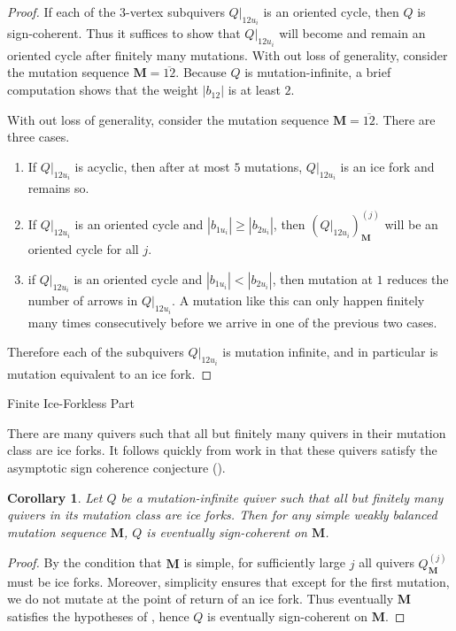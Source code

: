 \documentclass[12pt]{amsart}
\makeatletter
\newtheorem{cor}[thm]{Corollary}
\theoremstyle{definition}
\theoremstyle{remark}
\numberwithin{equation}{section}
\def\subsection{\@startsection{subsection}{3}%
  \z@{.5\linespacing\@plus.7\linespacing}{.1\linespacing}%
  {\bfseries}}
\makeatother
\begin{document}
\begin{proof}

If each of the $3$-vertex subquivers $Q|_{12u_i}$ is an oriented cycle, then $Q$ is sign-coherent. Thus it suffices to show that $Q|_{12u_i}$ will become and remain an oriented cycle after finitely many mutations. With out loss of generality, consider the mutation sequence $\mathbf M = \overline{12}$. Because $Q$ is mutation-infinite, a brief computation shows that the weight $|b_{12}|$ is at least $2$.

With out loss of generality, consider the mutation sequence $\mathbf M = \overline{12}$. 
There are three cases.
\begin{enumerate}
    \item If $Q|_{12u_i}$ is acyclic, then after at most $5$ mutations, $Q|_{12u_i}$ is an ice fork and remains so.
    \item If $Q|_{12u_i}$ is an oriented cycle and $|b_{1u_i}| \geq |b_{2u_i}|$, then $(Q|_{12u_i})^{(j)}_{\mathbf M}$ will be an oriented cycle for all $j$.
    \item if $Q|_{12u_i}$ is an oriented cycle and $|b_{1u_i}| < |b_{2u_i}|$, then mutation at $1$ reduces the number of arrows in $Q|_{12u_i}$. A mutation like this can only happen finitely many times consecutively before we arrive in one of the previous two cases.
\end{enumerate}
Therefore each of the subquivers  $Q|_{12u_i}$ is mutation infinite, and in particular is mutation equivalent to an ice fork.

\end{proof}
\fi

\subsection{Finite Ice-Forkless Part}

There are many quivers such that all but finitely many quivers in their mutation class are ice forks.  It follows quickly from work in  that these quivers satisfy the asymptotic sign coherence conjecture ().  

\begin{cor}
Let $Q$ be a mutation-infinite quiver such that all but finitely many quivers in its mutation class are ice forks.  Then for any simple weakly balanced mutation sequence $\mathbf M$, $Q$ is eventually sign-coherent on $\mathbf M$.
\end{cor}
\begin{proof}
By the condition that $\mathbf M$ is simple, for sufficiently large $j$ all quivers $Q_{\mathbf M}^{(j)}$ must be ice forks.  Moreover, simplicity ensures that except for the first mutation, we do not mutate at the point of return of an ice fork.  Thus eventually $\mathbf M$ satisfies the hypotheses of , hence $Q$ is eventually sign-coherent on $\mathbf M$.
\end{proof}
\end{document}
